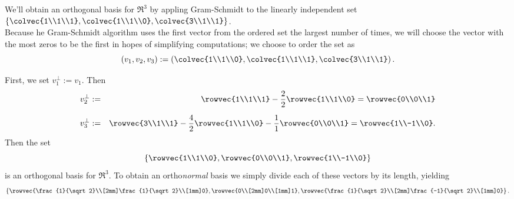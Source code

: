 \begin{example}
We'll  obtain an orthogonal basis for $\Re^3$ by appling Gram-Schmidt to the linearly independent set 
$\left\{\colvec{1\\1\\1}, \colvec{1\\1\\0},\colvec{3\\1\\1} \right\}$.\\

Because he Gram-Schmidt algorithm uses the first vector from the ordered set the largest number of times, we will choose the vector with the most zeros to be the first in hopes of simplifying computations; we choose to order the set as
\[( v_1,v_2,v_3)
:= \left( \colvec{1\\1\\0}, \colvec{1\\1\\1},\colvec{3\\1\\1} \right).\]

First, we set $v_1^\perp:=v_1$.  Then
\begin{eqnarray*}
v_2^\perp&:=& \rowvec{1\\1\\1} - \frac{2}{2}\rowvec{1\\1\\0} = \rowvec{0\\0\\1} \\[2mm]
v_3^\perp&:=& \rowvec{3\\1\\1} - \frac{4}{2}\rowvec{1\\1\\0} - \frac{1}{1}\rowvec{0\\0\\1} = \rowvec{1\\-1\\0}. 
\end{eqnarray*}
Then the set
\[
\left\{ \rowvec{1\\1\\0},\rowvec{0\\0\\1},\rowvec{1\\-1\\0}\right\}
\]
is an orthogonal basis for $\Re^3$.  To obtain an ortho{\itshape normal} basis we simply divide each of these vectors by its length, yielding
\[
\left\{ \rowvec{\frac{1}{\sqrt2}\\[2mm]\frac{1}{\sqrt2}\\[1mm]0},\rowvec{0\\[2mm]0\\[1mm]1},\rowvec{\frac{1}{\sqrt2}\\[2mm]\frac{-1}{\sqrt2}\\[1mm]0}\right\}.
\]
\end{example}

